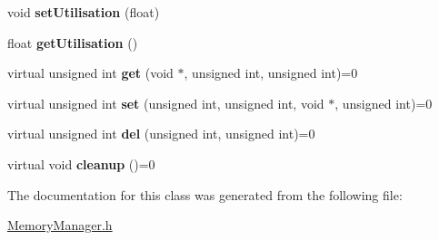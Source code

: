 \begin{DoxyCompactItemize}
\item 
\hypertarget{classMemoryManager_af55ecb905bf5e0a9c7c2329eae083503}{void {\bfseries set\-Utilisation} (float)}\label{classMemoryManager_af55ecb905bf5e0a9c7c2329eae083503}

\item 
\hypertarget{classMemoryManager_ad6949e320f1586586e8f5801b9bdbd15}{float {\bfseries get\-Utilisation} ()}\label{classMemoryManager_ad6949e320f1586586e8f5801b9bdbd15}

\item 
\hypertarget{classMemoryManager_ab657266701da9d28a2822314767b6910}{virtual unsigned int {\bfseries get} (void $\ast$, unsigned int, unsigned int)=0}\label{classMemoryManager_ab657266701da9d28a2822314767b6910}

\item 
\hypertarget{classMemoryManager_a53a7f4663f763985ce93f36d76d08370}{virtual unsigned int {\bfseries set} (unsigned int, unsigned int, void $\ast$, unsigned int)=0}\label{classMemoryManager_a53a7f4663f763985ce93f36d76d08370}

\item 
\hypertarget{classMemoryManager_af63cdf4a0fdbd5eb328e13959ff4c5b5}{virtual unsigned int {\bfseries del} (unsigned int, unsigned int)=0}\label{classMemoryManager_af63cdf4a0fdbd5eb328e13959ff4c5b5}

\item 
\hypertarget{classMemoryManager_ab24d56675e49909dfa6ccc67163d9add}{virtual void {\bfseries cleanup} ()=0}\label{classMemoryManager_ab24d56675e49909dfa6ccc67163d9add}

\end{DoxyCompactItemize}


\-The documentation for this class was generated from the following file\-:\begin{DoxyCompactItemize}
\item 
\hyperlink{MemoryManager_8h}{\-Memory\-Manager.\-h}\end{DoxyCompactItemize}
